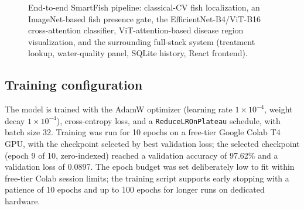 \documentclass[conference]{IEEEtran}
\begin{document}
\begin{figure}[t]
{%
}
\caption{End-to-end SmartFish pipeline: classical-CV fish localization, an ImageNet-based fish presence gate, the EfficientNet-B4/ViT-B16 cross-attention classifier, ViT-attention-based disease region visualization, and the surrounding full-stack system (treatment lookup, water-quality panel, SQLite history, React frontend).}
\label{fig:architecture}
\end{figure}

\subsection{Training configuration}
The model is trained with the AdamW optimizer (learning rate $1\times10^{-4}$, weight decay $1\times10^{-4}$), cross-entropy loss, and a \texttt{ReduceLROnPlateau} schedule, with batch size 32. Training was run for 10 epochs on a free-tier Google Colab T4 GPU, with the checkpoint selected by best validation loss; the selected checkpoint (epoch 9 of 10, zero-indexed) reached a validation accuracy of 97.62\% and a validation loss of 0.0897. The epoch budget was set deliberately low to fit within free-tier Colab session limits; the training script supports early stopping with a patience of 10 epochs and up to 100 epochs for longer runs on dedicated hardware.
\end{document}
